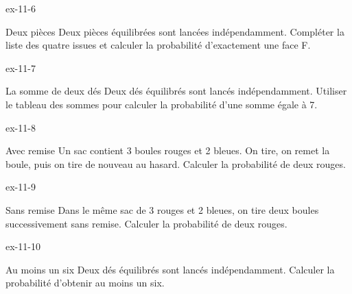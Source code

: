 \clearpage{}
\begin{blocLivre}{ex-11-6}\begin{exercice}[2]{Deux pièces}
Deux pièces équilibrées sont lancées indépendamment. Compléter la liste des quatre issues et calculer la probabilité d’exactement une face F.
\label{fig-ex-11-6}
\end{exercice}\end{blocLivre}
\begin{blocLivre}{ex-11-7}\begin{exercice}[2]{La somme de deux dés}
Deux dés équilibrés sont lancés indépendamment. Utiliser le tableau des sommes pour calculer la probabilité d’une somme égale à 7.
\label{fig-ex-11-7}
\end{exercice}\end{blocLivre}
\begin{blocLivre}{ex-11-8}\begin{exercice}[2]{Avec remise}
Un sac contient 3 boules rouges et 2 bleues. On tire, on remet la boule, puis on tire de nouveau au hasard. Calculer la probabilité de deux rouges.
\label{fig-ex-11-8}
\end{exercice}\end{blocLivre}
\begin{blocLivre}{ex-11-9}\begin{exercice}[2]{Sans remise}
Dans le même sac de 3 rouges et 2 bleues, on tire deux boules successivement sans remise. Calculer la probabilité de deux rouges.
\label{fig-ex-11-9}
\end{exercice}\end{blocLivre}
\begin{blocLivre}{ex-11-10}\begin{exercice}[2]{Au moins un six}
Deux dés équilibrés sont lancés indépendamment. Calculer la probabilité d’obtenir au moins un six.
\end{exercice}\end{blocLivre}

